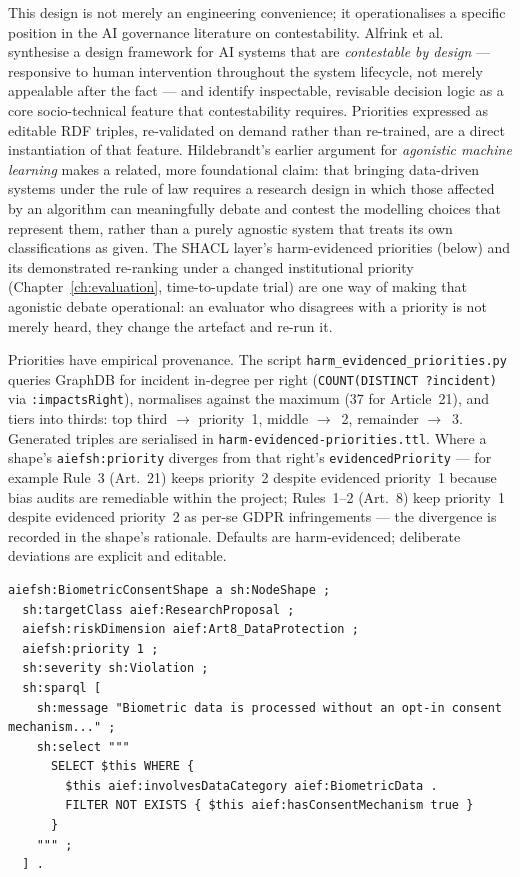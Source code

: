 This design is not merely an engineering convenience; it operationalises a specific position in the AI governance literature on contestability. Alfrink et al.\ \cite{alfrink2023contestable} synthesise a design framework for AI systems that are \emph{contestable by design} --- responsive to human intervention throughout the system lifecycle, not merely appealable after the fact --- and identify inspectable, revisable decision logic as a core socio-technical feature that contestability requires. Priorities expressed as editable RDF triples, re-validated on demand rather than re-trained, are a direct instantiation of that feature. Hildebrandt's earlier argument for \emph{agonistic machine learning} \cite{hildebrandt2019agonistic} makes a related, more foundational claim: that bringing data-driven systems under the rule of law requires a research design in which those affected by an algorithm can meaningfully debate and contest the modelling choices that represent them, rather than a purely agnostic system that treats its own classifications as given. The SHACL layer's harm-evidenced priorities (below) and its demonstrated re-ranking under a changed institutional priority (Chapter~\ref{ch:evaluation}, time-to-update trial) are one way of making that agonistic debate operational: an evaluator who disagrees with a priority is not merely heard, they change the artefact and re-run it.

Priorities have empirical provenance. The script \texttt{harm\_evidenced\_priorities.py} queries GraphDB for incident in-degree per right (\texttt{COUNT(DISTINCT ?incident)} via \texttt{:impactsRight}), normalises against the maximum (37 for Article~21), and tiers into thirds: top third $\rightarrow$ priority~1, middle $\rightarrow$~2, remainder $\rightarrow$~3. Generated triples are serialised in \texttt{harm-evidenced-priorities.ttl}. Where a shape's \texttt{aiefsh:priority} diverges from that right's \texttt{evidencedPriority} --- for example Rule~3 (Art.~21) keeps priority~2 despite evidenced priority~1 because bias audits are remediable within the project; Rules~1--2 (Art.~8) keep priority~1 despite evidenced priority~2 as per-se GDPR infringements --- the divergence is recorded in the shape's rationale. Defaults are harm-evidenced; deliberate deviations are explicit and editable.

\begin{lstlisting}[caption={BiometricConsentShape (excerpt) --- dimension, priority, severity, and SPARQL pattern as data.},label={lst:biometric-shape},language={},basicstyle=\ttfamily\scriptsize]
aiefsh:BiometricConsentShape a sh:NodeShape ;
  sh:targetClass aief:ResearchProposal ;
  aiefsh:riskDimension aief:Art8_DataProtection ;
  aiefsh:priority 1 ;
  sh:severity sh:Violation ;
  sh:sparql [
    sh:message "Biometric data is processed without an opt-in consent mechanism..." ;
    sh:select """
      SELECT $this WHERE {
        $this aief:involvesDataCategory aief:BiometricData .
        FILTER NOT EXISTS { $this aief:hasConsentMechanism true }
      }
    """ ;
  ] .
\end{lstlisting}

